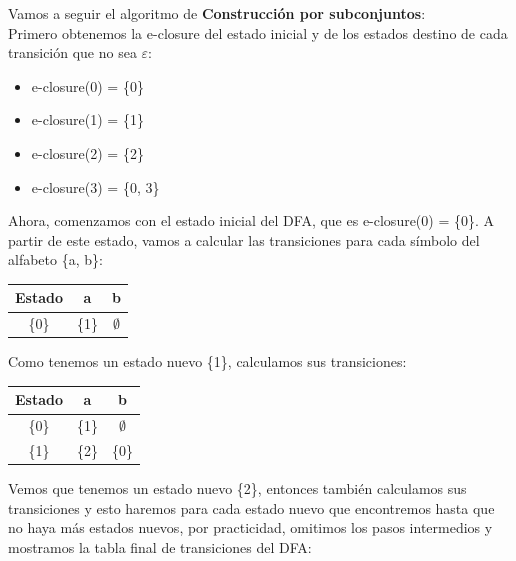 \documentclass[12pt, letterpaper]{article}
\begin{document}
\begin{enumerate}
\begin{center}
    \end{center}
    Vamos a seguir el algoritmo de \textbf{Construcción por subconjuntos}:\\
    Primero obtenemos la e-closure del estado inicial y de los estados destino de cada transición que no sea $\varepsilon$:
    \begin{itemize}
    \item e-closure(0) = \{0\}
    \item e-closure(1) = \{1\}
    \item e-closure(2) = \{2\}
    \item e-closure(3) = \{0, 3\}
    \end{itemize}
    Ahora, comenzamos con el estado inicial del DFA, que es e-closure(0) = \{0\}. A partir de este estado, vamos a calcular las transiciones para cada símbolo del alfabeto \{a, b\}:
    \begin{table}[H]
      \centering
      \begin{tabular}{|c|c|c|}
        \hline
        \textbf{Estado} & \textbf{a} & \textbf{b} \\ \hline
        \{0\}           & \{1\}      & $\emptyset$   \\ \hline
      \end{tabular}
    \end{table}
    Como tenemos un estado nuevo \{1\}, calculamos sus transiciones:
    \begin{table}[H]
      \centering
      \begin{tabular}{|c|c|c|}
        \hline
        \textbf{Estado} & \textbf{a} & \textbf{b} \\ \hline
        \{0\}           & \{1\}      & $\emptyset$   \\ \hline
        \{1\}           & \{2\}      & \{0\}      \\ \hline
      \end{tabular}
    \end{table}
    Vemos que tenemos un estado nuevo \{2\}, entonces también calculamos sus transiciones y esto haremos para cada estado nuevo que encontremos hasta que no haya más estados nuevos, por practicidad, omitimos los pasos intermedios y mostramos la tabla final de transiciones del DFA:

\end{enumerate}
\end{document}
